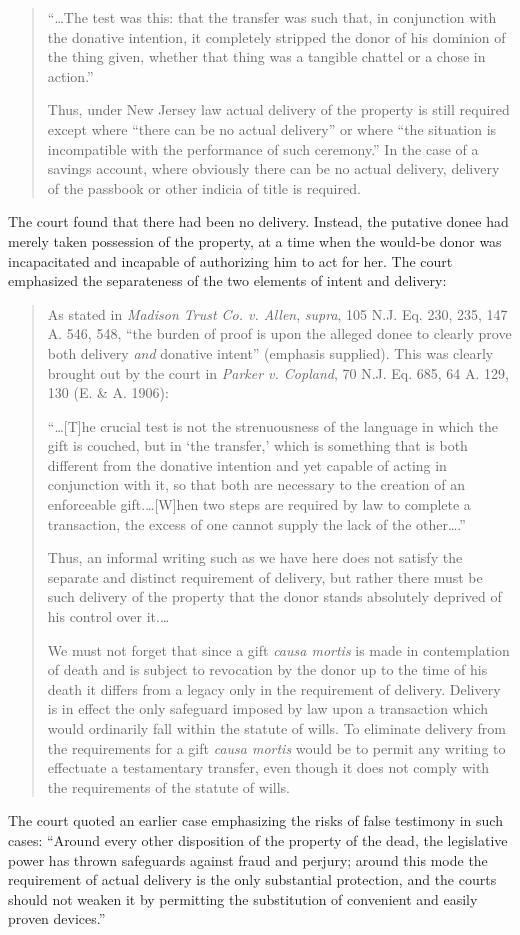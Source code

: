 \begin{quotation}
``\ldots The test was this: that the transfer was such that, in conjunction with
the donative intention, it completely stripped the donor of his dominion of the
thing given, whether that thing was a tangible chattel or a chose in action.''

Thus, under New Jersey law actual delivery of the property is still required
except where ``there can be no actual delivery'' or where ``the situation is
incompatible with the performance of such ceremony.'' In the case of a savings
account, where obviously there can be no actual delivery, delivery of the
passbook or other indicia of title is required. 
\end{quotation}
The court found that there had been no delivery.  Instead, the putative donee
had merely taken possession of the property, at a time when the would-be donor
was incapacitated and incapable of authorizing him to act for her.  The court
emphasized the separateness of the two elements of intent and delivery:
\begin{quotation}
As stated in \emph{Madison Trust Co. v. Allen}, \emph{supra}, 105 N.J. Eq. 230,
235, 147 A.
546, 548, ``the burden of proof is upon the alleged donee to clearly prove both
delivery \textit{and} donative intent'' (emphasis supplied). This was clearly
brought out by the court in \emph{Parker v. Copland}, 70 N.J. Eq. 685, 64 A.
129, 130 (E. \& A. 1906):

``\ldots [T]he crucial test is not the strenuousness of the language in which
the gift is couched, but in `the transfer,' which is something that is both
different from the donative intention and yet capable of acting in conjunction
with it, so that both are necessary to the creation of an enforceable
gift.\ldots [W]hen two steps are required by law to complete a transaction, the
excess of one cannot supply the lack of the other\ldots.''

Thus, an informal writing such as we have here does not satisfy the separate and
distinct requirement of delivery, but rather there must be such delivery of the
property that the donor stands absolutely deprived of his control over it.\ldots

We must not forget that since a gift \textit{causa mortis} is made in
contemplation of death and is subject to revocation by the donor up to the time
of his death it differs from a legacy only in the requirement of delivery.
Delivery is in effect the only safeguard imposed by law upon a transaction
which would ordinarily fall within the statute of wills. To eliminate delivery
from the requirements for a gift \textit{causa mortis} would be to permit any
writing to effectuate a testamentary transfer, even though it does not comply
with the requirements of the statute of wills.
\end{quotation}
The court quoted an earlier case emphasizing the risks of false testimony in
such cases: ``Around every other disposition of the property of the dead,
the legislative power has thrown safeguards against fraud and perjury; around
this mode the requirement of actual delivery is the only substantial
protection, and the courts should not weaken it by permitting the substitution
of convenient and easily proven devices.''

